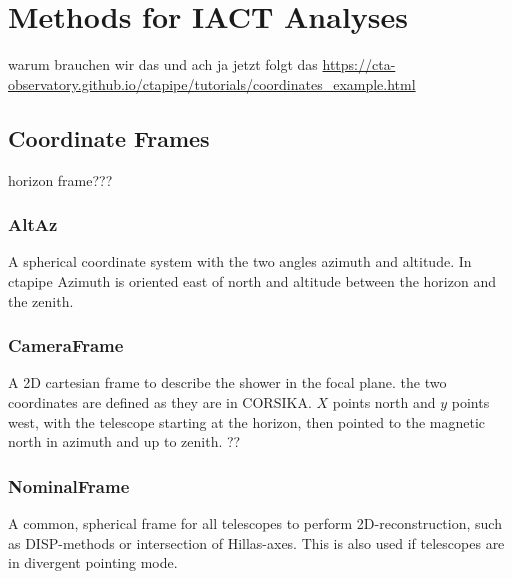 \chapter{Methods for IACT Analyses}
warum brauchen wir das und ach ja jetzt folgt das
\url{https://cta-observatory.github.io/ctapipe/tutorials/coordinates_example.html}


\section{Coordinate Frames}
horizon frame???

\subsection{AltAz}
A spherical coordinate system with the two angles azimuth and altitude.
In ctapipe Azimuth is oriented east of north and altitude between the horizon 
and the zenith.

\subsection{CameraFrame}
A 2D cartesian frame to describe the shower in the focal plane.
the two coordinates are defined as they are in CORSIKA.
$X$ points north and $y$ points west, with the telescope
starting at the horizon, then pointed to the 
magnetic north in azimuth and up to zenith. ??



\subsection{NominalFrame}
A common, spherical frame for all telescopes to perform 2D-reconstruction,
such as DISP-methods or intersection of Hillas-axes.
This is also used if telescopes are in divergent pointing mode.



